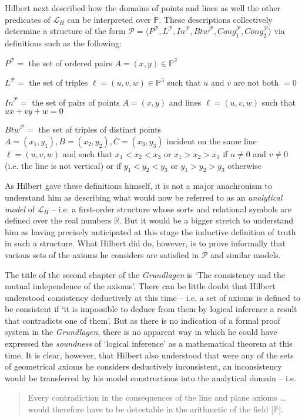 \documentclass[11pt,fleqn,leqno]{article}
\begin{document}
Hilbert next described how the domains of points and lines as well the other predicates of $\mathcal{L}_H$ can be interpreted over $\mathbb{P}$.  These descriptions collectively determine a structure of the form $\mathcal{P} = \langle P^{\mathcal{P}}, L^{\mathcal{P}},\mathit{In}^{\mathcal{P}},\mathit{Btw}^{\mathcal{P}},\mathit{Cong}_1^{\mathcal{P}},\mathit{Cong}_2^{\mathcal{P}} \rangle$ via definitions such as the following:
\begin{example}
\label{infdefns}
\begin{compactenum}[i)]
\item $P^{\mathcal{P}} =$ the set of ordered pairs $A = (x,y) \in \mathbb{P}^2$
\item $L^{\mathcal{P}} =$ the set of triples $\ell = (u,v,w) \in \mathbb{P}^3$ such that $u$ and $v$ are not both $= 0$ 
\item $\mathit{In}^{\mathcal{P}} =$ the set of pairs of points $A = (x,y)$ and lines $\ell = (u,v,w)$ such that $u x + v y + w = 0$
\item $\mathit{Btw}^{\mathcal{P}} =$ the set of triples of distinct points $A = (x_1,y_1), B= (x_2,y_2),C = (x_3,y_3) $ incident on the same line $\ell = (u,v,w)$ and such that $x_1 < x_2 < x_3$ or $x_1 > x_2 > x_3$ if $u \neq 0$ and $v \neq 0$ (i.e. the line is not vertical) or if $y_1 < y _2 < y_3$ or $y_1 > y_2 > y_3$ otherwise
\end{compactenum}
\end{example}

As Hilbert gave these definitions himself, it is not a major anachronism to understand him as describing what would now be referred to as an \textsl{analytical model} of $\mathcal{L}_H$ -- i.e. a first-order structure whose sorts and relational symbols are defined over the real numbers $\mathbb{R}$.    But it would be a bigger stretch to understand him as having precisely anticipated at this stage the inductive definition of truth in such a structure.  What Hilbert did do, however, is to prove informally that various sets of the axioms he considers are satisfied in $\mathcal{P}$ and similar models.

The title of the second chapter of the \textsl{Grundlagen} is `The consistency and the mutual independence of the axioms'.   There can be little doubt that Hilbert understood  consistency deductively at this time -- i.e. a set of axioms is defined to be consistent if `it is impossible to deduce  from them by logical inference a result that contradicts one of them'.   But as there is no indication of a formal proof system in the \textsl{Grundlagen}, there is no apparent way in which he could have expressed the \textsl{soundness} of `logical inference' as a mathematical theorem at this time.   It is clear, however, that Hilbert also understood that were any of the sets of geometrical axioms he considers deductively inconsistent, an inconsistency would be transferred by his model constructions into the analytical domain -- i.e. 
\begin{quote}
{\footnotesize
Every contradiction in the consequences of the line and plane axioms $\ldots$ would therefore have to be detectable in the arithmetic of the field $[\mathbb{P}$]. \hfill \citeyearpar[p. 30]{Hilbert1971}}
\end{quote}
\end{document}
